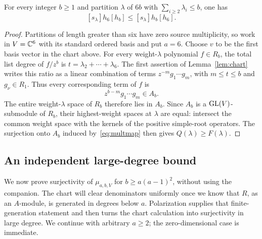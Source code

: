\begin{corollary}\label{cor:first-row}
For every integer \(b\ge1\) and partition \(\lambda\) of \(6b\) with
\(\sum_{i\ge2}\lambda_i\le b\), one has
\[
             [s_\lambda]h_6[h_b]\le [s_\lambda]h_b[h_6].
\]
\end{corollary}
\begin{proof}
Partitions of length greater than six have zero source multiplicity, so
work in \(V=\mathbb C^6\) with its standard ordered basis and put \(a=6\).
Choose \(v\) to be the first basis vector in the chart above.
For every weight-\(\lambda\) polynomial \(f\in R_b\), the total
list degree of \(f/z^b\) is
\(t=\lambda_2+\cdots+\lambda_6\).
The first assertion of Lemma~\ref{lem:chart} writes this ratio as a
linear combination of terms \(z^{-m}g_1\cdots g_m\), with
\(m\le t\le b\) and \(g_\nu\in R_1\). Thus every corresponding
term of \(f\) is
\[
                     z^{b-m}g_1\cdots g_m\in A_b.
\]
The entire weight-\(\lambda\) space of \(R_b\) therefore lies in
\(A_b\). Since \(A_b\) is a \(\operatorname{GL}(V)\)-submodule of \(R_b\), their
highest-weight spaces at \(\lambda\) are equal: intersect the common
weight space with the kernels of the positive simple-root operators.
The surjection onto \(A_b\) induced by~\eqref{eq:multmap} then gives
\(Q(\lambda)\ge F(\lambda)\).
\end{proof}

\subsection{An independent large-degree bound}
We now prove surjectivity of \(\mu_{a,b,V}\) for
\(b\ge a(a-1)^2\), without using the companion. The chart will clear
denominators uniformly once we know that \(R\), as an \(A\)-module,
is generated in degrees below \(a\). Polarization supplies that
finite-generation statement and then turns the chart calculation into
surjectivity in large degree. We continue with arbitrary \(a\ge2\);
the zero-dimensional case is immediate.

